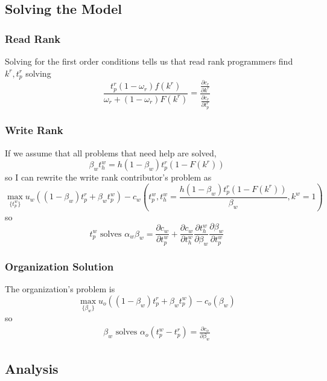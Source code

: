 \documentclass[source/paper/main.tex]{subfiles}
\begin{document}
\subsection{Solving the Model}
\subsubsection{Read Rank}
Solving for the first order conditions tells us that read rank programmers find $k^r, t_p^r$ solving 
$$\frac{t_p^r(1-\omega_r)f(k^r)}{\omega_r + (1-\omega_r) F(k^r)} = \frac{\frac{\partial c_r}{\partial k^r}}{\frac{\partial c_r}{\partial t_p^r}}$$
\subsubsection{Write Rank}
If we assume that all problems that need help are solved, $$\beta_w t_h^w = h(1-\beta_w) t_p^r (1-F(k^r))$$ so I can rewrite the write rank contributor's problem as
$$\max_{\{t_p^w\}} u_w\left((1-\beta_w) t_p^r + \beta_w t_p^w \right) - c_w\left(t_p^w, t_h^w = \frac{ h (1-\beta_w) t_p^r(1-F(k^r))}{\beta_w}, k^w = 1\right)$$
so $$t_p^w \text{ solves } \alpha_w \beta_w = \frac{\partial c_w}{\partial t_p^w} + \frac{\partial c_w}{\partial t_h^w}\frac{\partial t_h^w}{\partial \beta_w}\frac{\partial \beta_w}{\partial t_p^w}$$

\subsubsection{Organization Solution}
The organization's problem is 
$$\max_{\{\beta_w\}} u_o\left((1-\beta_w) t_p^r + \beta_w t_p^w\right) - c_o(\beta_w)$$ 
so 
\begin{align}
    \beta_w \text{ solves } \alpha_o (t_p^w - t_p^r) = \frac{\partial c_o}{\partial \beta_w} \label{org_solution}
\end{align}
\subsection{Analysis}
\end{document}
